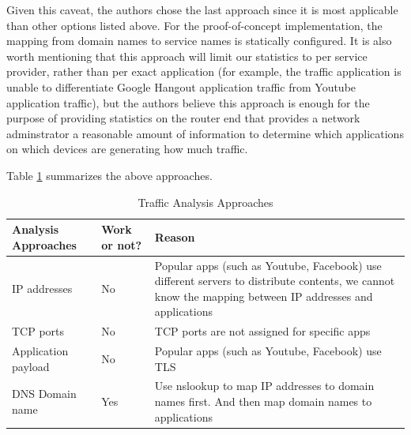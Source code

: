 \begin{itemize}
	Given this caveat, the authors chose the last approach since it is most applicable than other options listed above. For the proof-of-concept implementation, the mapping from domain names to service names is statically configured. It is also worth mentioning that this approach will limit our statistics to per service provider, rather than per exact application (for example, the traffic application is unable to differentiate Google Hangout application traffic from Youtube application traffic), but the authors believe this approach is enough for the purpose of providing statistics on the router end that provides a network adminstrator a reasonable amount of information to determine which applications on which devices are generating how much traffic.

\end{itemize} 
	
Table \ref{appfilterchoice} summarizes the above approaches.

\begin{table}[h]
	\centering
	\caption{Traffic Analysis Approaches}
	\label{appfilterchoice}
	\begin{tabular}{p{4cm}|p{2cm}|p{10cm}} \hline
		Analysis Approaches & Work or not? & Reason \\ \hline
		IP addresses & No & Popular apps (such as Youtube, Facebook) use different servers to distribute contents, we cannot know the mapping between IP addresses and applications \\ \hline
		TCP ports & No & TCP ports are not assigned for specific apps\\ \hline
		Application payload & No  & Popular apps (such as Youtube, Facebook) use TLS\\ \hline
		DNS Domain name & Yes & Use nslookup to map IP addresses to domain names first. And then map domain names to applications \\
		\hline\end{tabular}
\end{table}